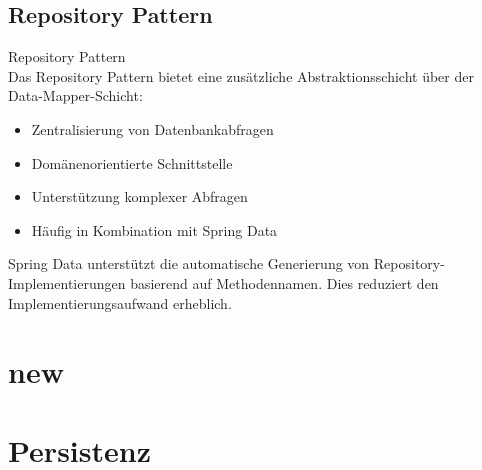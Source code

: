\subsection{Repository Pattern}

\begin{concept}{Repository Pattern}\\
Das Repository Pattern bietet eine zusätzliche Abstraktionsschicht über der Data-Mapper-Schicht:
\begin{itemize}
    \item Zentralisierung von Datenbankabfragen
    \item Domänenorientierte Schnittstelle
    \item Unterstützung komplexer Abfragen
    \item Häufig in Kombination mit Spring Data
\end{itemize}
\end{concept}

\begin{remark}
Spring Data unterstützt die automatische Generierung von Repository-Implementierungen basierend auf Methodennamen. Dies reduziert den Implementierungsaufwand erheblich.
\end{remark}



\pagebreak

\section{new}

\section{Persistenz}

